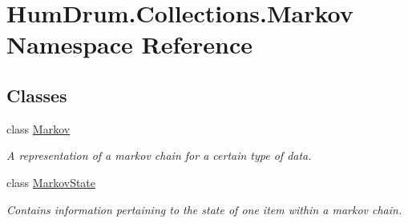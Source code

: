 \hypertarget{namespaceHumDrum_1_1Collections_1_1Markov}{}\section{Hum\+Drum.\+Collections.\+Markov Namespace Reference}
\label{namespaceHumDrum_1_1Collections_1_1Markov}
\subsection*{Classes}
\begin{DoxyCompactItemize}
\item 
class \hyperlink{classHumDrum_1_1Collections_1_1Markov_1_1Markov}{Markov}
\begin{DoxyCompactList}\small\item\em A representation of a markov chain for a certain type of data. \end{DoxyCompactList}\item 
class \hyperlink{classHumDrum_1_1Collections_1_1Markov_1_1MarkovState}{Markov\+State}
\begin{DoxyCompactList}\small\item\em Contains information pertaining to the state of one item within a markov chain. \end{DoxyCompactList}\end{DoxyCompactItemize}
